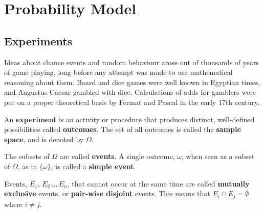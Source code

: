 \chapter{Probability Model}\label{S:ProbModel}

\section{Experiments}\label{S:Experiments}

Ideas about chance events and random behaviour arose out of thousands of
years of game playing, long before any attempt was made to use
mathematical reasoning about them. Board and dice games were well known
in Egyptian times, and Augustus Caesar gambled with dice. Calculations
of odds for gamblers were put on a proper theoretical basis by Fermat
and Pascal in the early 17th century.

\begin{definition}
An {\bf experiment} is an activity or procedure that produces distinct, well-defined possibilities called {\bf outcomes}.  
The set  of all outcomes   is called the {\bf sample space}, and is denoted by $\Omega$.

The subsets of $\Omega$ are called {\bf events}.  
A single outcome, $\omega$, when seen as a subset of $\Omega$, as in
$\{\omega\}$, is called a  {\bf simple event}.

Events, $E_1,\, E_2\, \dots \, E_n$,  that cannot occur at the same time are called {\bf mutually exclusive} events, or {\bf pair-wise disjoint} events.  This means that $E_i
\cap E_j = \emptyset $ where $i\not=j$.
\end{definition}



